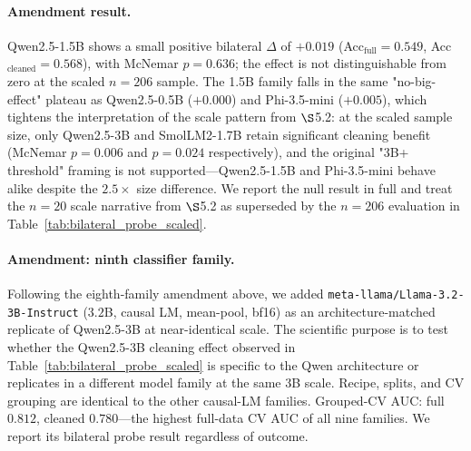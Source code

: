 \paragraph{Amendment result.} Qwen2.5-1.5B shows a small positive
bilateral $\Delta$ of $+0.019$ (Acc$_\text{full}=0.549$,
Acc$_\text{cleaned}=0.568$), with McNemar $p=0.636$; the effect is
not distinguishable from zero at the scaled $n=206$ sample. The 1.5B
family falls in the same "no-big-effect" plateau as Qwen2.5-0.5B
($+0.000$) and Phi-3.5-mini ($+0.005$), which tightens the
interpretation of the scale pattern from $\S$5.2: at the scaled
sample size, only Qwen2.5-3B and SmolLM2-1.7B retain significant
cleaning benefit (McNemar $p=0.006$ and $p=0.024$ respectively), and
the original "3B+ threshold" framing is not supported---Qwen2.5-1.5B
and Phi-3.5-mini behave alike despite the $2.5{\times}$ size
difference. We report the null result in full and treat the
$n=20$ scale narrative from $\S$5.2 as superseded by the
$n=206$ evaluation in Table~\ref{tab:bilateral_probe_scaled}.



\paragraph{Amendment: ninth classifier family.} Following the
eighth-family amendment above, we added
\texttt{meta-llama/Llama-3.2-3B-Instruct} ($3.2$B, causal LM,
mean-pool, bf16) as an architecture-matched replicate of Qwen2.5-3B
at near-identical scale. The scientific purpose is to test whether
the Qwen2.5-3B cleaning effect observed in
Table~\ref{tab:bilateral_probe_scaled} is specific to the Qwen
architecture or replicates in a different model family at the same
$3$B scale. Recipe, splits, and CV grouping are identical to the
other causal-LM families. Grouped-CV AUC: full $0.812$, cleaned
$0.780$---the highest full-data CV AUC of all nine families. We
report its bilateral probe result regardless of outcome.

